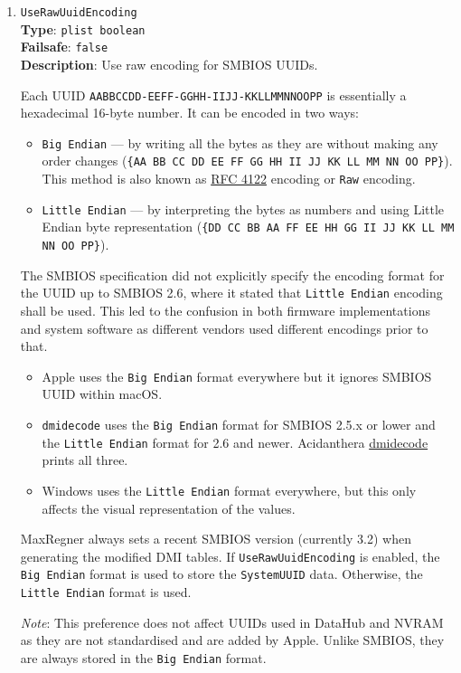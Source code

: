 \documentclass[]{article}
\providecommand{\tightlist}{%
  \setlength{\itemsep}{0pt}\setlength{\parskip}{0pt}}
\begin{document}
\begin{enumerate}
  \emph{Note}: A side effect of using the \texttt{Custom} approach that it
  makes SMBIOS updates exclusive to macOS, avoiding a collision with existing
  Windows activation and custom OEM software but potentially obstructing
  the operation of Apple-specific tools.
\item
  \texttt{UseRawUuidEncoding}\\
  \textbf{Type}: \texttt{plist\ boolean}\\
  \textbf{Failsafe}: \texttt{false}\\
  \textbf{Description}: Use raw encoding for SMBIOS UUIDs.

  Each UUID \texttt{AABBCCDD-EEFF-GGHH-IIJJ-KKLLMMNNOOPP} is
  essentially a hexadecimal 16-byte number. It can be encoded
  in two ways:

  \begin{itemize}
    \tightlist
    \item \texttt{Big Endian} --- by writing all the bytes as they are without making
      any order changes (\texttt{\{AA BB CC DD EE FF GG HH II JJ KK LL MM NN OO PP\}}).
      This method is also known as \href{https://tools.ietf.org/html/rfc4122}{RFC 4122}
      encoding or \texttt{Raw} encoding.
    \item \texttt{Little Endian} --- by interpreting the bytes as numbers and using
      Little Endian byte representation
      (\texttt{\{DD CC BB AA FF EE HH GG II JJ KK LL MM NN OO PP\}}).
  \end{itemize}

  The SMBIOS specification did not explicitly specify the encoding format for the
  UUID up to SMBIOS 2.6, where it stated that \texttt{Little Endian} encoding
  shall be used. This led to the confusion in both firmware implementations
  and system software as different vendors used different encodings prior to that.

  \begin{itemize}
    \tightlist
    \item Apple uses the \texttt{Big Endian} format everywhere but it ignores SMBIOS UUID within macOS.
    \item \texttt{dmidecode} uses the \texttt{Big Endian} format for SMBIOS 2.5.x or lower
    and the \texttt{Little Endian} format for 2.6 and newer. Acidanthera
    \href{https://github.com/acidanthera/dmidecode}{dmidecode} prints all three.
    \item Windows uses the \texttt{Little Endian} format everywhere, but this only affects
    the visual representation of the values.
  \end{itemize}

  MaxRegner always sets a recent SMBIOS version (currently 3.2) when generating
  the modified DMI tables. If \texttt{UseRawUuidEncoding} is enabled, the \texttt{Big Endian}
  format is used to store the \texttt{SystemUUID} data. Otherwise, the \texttt{Little Endian}
  format is used.

  \emph{Note}: This preference does not affect UUIDs used in DataHub and NVRAM
  as they are not standardised and are added by Apple. Unlike SMBIOS, they are
  always stored in the \texttt{Big Endian} format.

\end{enumerate}
\end{document}
